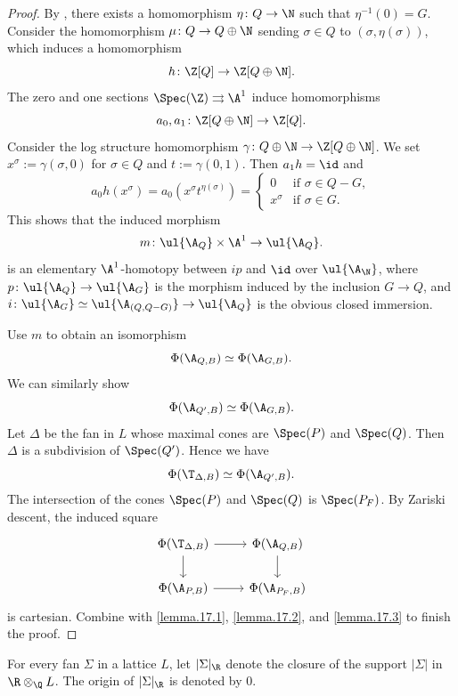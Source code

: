 \documentclass[10pt]{amsart}
\begin{document}
\begin{proof}
By \cite[Proposition I.2.2.1]{Ogu}, there exists a homomorphism $\eta\colon Q\to \N$ such that $\eta^{-1}(0)=G$.
Consider the homomorphism $\mu\colon Q\to Q\oplus \N$ sending $\sigma\in Q$ to $(\sigma,\eta(\sigma))$, which induces a homomorphism
\[
h\colon \Z[Q]\to \Z[Q\oplus \N].
\]
The zero and one sections $\Spec(\Z)\rightrightarrows \A^1$ induce homomorphisms
\[
a_0,a_1\colon \Z[Q\oplus \N]
\to
\Z[Q].
\]
Consider the log structure homomorphism $\gamma\colon Q\oplus \N \to \Z[Q\oplus \N]$.
We set $x^\sigma:=\gamma(\sigma,0)$ for $\sigma\in Q$ and $t:=\gamma(0,1)$.
Then $a_1h=\id$ and
\[
a_0 h(x^\sigma)=a_0(x^\sigma t^{\eta(\sigma)})
=
\left\{
\begin{array}{ll}
0 & \text{if }\sigma\in Q-G,
\\
x^\sigma & \text{if }\sigma\in G.
\end{array}
\right.
\]
This shows that the induced morphism
\[
m\colon \ul{\A_Q}\times \A^1\to \ul{\A_Q}.
\]
is an elementary $\A^1$-homotopy between $ip$ and $\id$ over $\ul{\A_\N}$, where $p\colon \ul{\A_Q}\to \ul{\A_{G}}$ is the morphism induced by the inclusion $G\to Q$, and $i\colon \ul{\A_G}\simeq \ul{\A_{(Q,Q-G)}}\to \ul{\A_Q}$ is the obvious closed immersion.




Use $m$ to obtain an isomorphism
\begin{equation}
\label{lemma.17.1}
\Phi(\A_{Q,B})
\simeq
\Phi(\A_{G,B}).
\end{equation}
We can similarly show
\begin{equation}
\label{lemma.17.2}
\Phi(\A_{Q',B})
\simeq
\Phi(\A_{G,B}).
\end{equation}
Let $\Delta$ be the fan in $L$ whose maximal cones are $\Spec(P)$ and $\Spec(Q)$.
Then $\Delta$ is a subdivision of $\Spec(Q')$.
Hence we have
\begin{equation}
\label{lemma.17.3}
\Phi(\T_{\Delta,B})\simeq \Phi(\A_{Q',B}).
\end{equation}
The intersection of the cones $\Spec(P)$ and $\Spec(Q)$ is $\Spec(P_F)$.
By Zariski descent, the induced square
\[
\begin{tikzcd}
\Phi(\T_{\Delta,B})\ar[d]\ar[r]&
\Phi(\A_{Q,B})\ar[d]
\\
\Phi(\A_{P,B})\ar[r]&
\Phi(\A_{P_F,B})
\end{tikzcd}
\]
is cartesian.
Combine with \eqref{lemma.17.1}, \eqref{lemma.17.2}, and \eqref{lemma.17.3} to finish the proof.
\end{proof}

For every fan $\Sigma$ in a lattice $L$, let $|\Sigma|_{\R}$ denote the closure of the support $|\Sigma|$ in $\R\otimes_{\Q} L$.
The origin of $|\Sigma|_{\R}$ is denoted by $0$.
\end{document}
